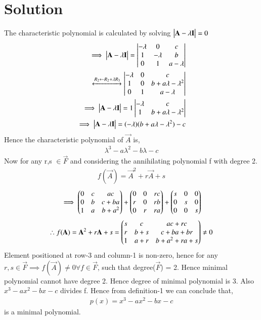 \documentclass[journal,12pt,twocolumn]{IEEEtran}
\begin{document}
\section{Solution}
The characteristic polynomial is calculated by solving $\begin{vmatrix}\mathbf{A}-\lambda \mathbf{I}\end{vmatrix} = 0$
\begin{align}
\implies \begin{vmatrix}\mathbf{A}-\lambda \mathbf{I}\end{vmatrix} = \begin{vmatrix}-\lambda &0&c\\1&-\lambda &b\\0&1&a-\lambda\end{vmatrix}\\
\xleftrightarrow[]{R_2\leftarrow R_2+\lambda R_3} \begin{vmatrix}-\lambda &0&c\\1&0&b+a\lambda-\lambda^2\\0&1&a-\lambda\end{vmatrix}\\
\implies \begin{vmatrix}\mathbf{A}-\lambda \mathbf{I}\end{vmatrix} = 1\begin{vmatrix}-\lambda & c \\1 & b+a\lambda-\lambda^2\end{vmatrix}\\
\implies \begin{vmatrix}\mathbf{A}-\lambda \mathbf{I}\end{vmatrix} = (-\lambda)( b+a\lambda-\lambda^2) - c
\end{align}
Hence the characteristic polynomial of $\vec{A}$ is,
\begin{align}
\lambda^3-a\lambda^2-b\lambda-c
\label{cp}
\end{align}
Now for any r,s $\in \vec{F}$ and considering the annihilating polynomial f with degree 2.
\begin{align}
f(\vec{A}) = \vec{A}^2+r\vec{A}+s
\end{align}
\begin{align}
\implies \begin{pmatrix}0&c&ac\\0&b&c+ba\\1&a&b+a^2\end{pmatrix} + \begin{pmatrix}0&0&rc\\r&0&rb\\0&r&ra\end{pmatrix}+ \begin{pmatrix}s&0&0\\0&s&0\\0&0&s\end{pmatrix}
\end{align}
\begin{align}
\therefore f(\mathbf{A}) = \mathbf{A}^2+r\mathbf{A}+s = \begin{pmatrix}s&c&ac+rc\\r&b+s&c+ba+br\\1&a+r&b+a^2+ra+s\end{pmatrix} \neq 0
\label{fa}
\end{align}
Element positioned at row-3 and column-1 is non-zero, hence for any $r,s \in \vec{F} \implies f(\vec{A})\neq 0 \forall f \in \vec{F}$, such that degree($\vec{F}$) = 2. Hence minimal polynomial cannot have degree 2. Hence degree of minimal polynomial is 3. Also $x^3-ax^2-bx-c$ divides f. Hence from definition-1 we can conclude that,
\begin{align}
p(x) = x^3-ax^2-bx-c
\end{align} 
is a minimal polynomial.
\end{document}
